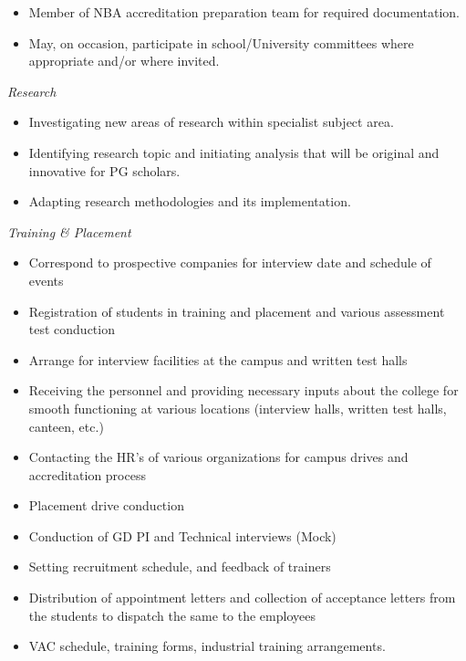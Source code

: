 \begin{experiences}
{\begin{itemize}
                  			\item Member of NBA accreditation preparation team for required documentation.     
                  			         
                  			\item May, on occasion, participate in school/University committees where appropriate and/or where invited.  
                  	    \end{itemize}
                     
                      \textit{Research}
                      \begin{itemize}
                      
                      	\item Investigating new areas of research within specialist subject area. 
                      	\item Identifying research topic and initiating analysis that will be original and innovative for PG scholars.
                     	\item Adapting research methodologies and its implementation.
                      	  
                      \end{itemize}
                         \vspace{0.5em}
	                  \textit{Training \& Placement}
                  	\begin{itemize}
                  	
                  	\item Correspond to prospective companies for interview date and schedule of events
                  	\item Registration of students in training and placement and various assessment test conduction
                  	\item Arrange for interview facilities at the campus and written test halls
                  	\item Receiving the personnel and providing necessary inputs about the college for smooth functioning at various locations (interview halls, written test halls, canteen, etc.)
                  	\item Contacting the HR’s of various organizations for campus drives and accreditation process
                  	\item Placement drive conduction
                  	\item Conduction of GD PI and Technical interviews (Mock)
                  	\item Setting recruitment schedule, and feedback of trainers
                  	\item Distribution of appointment letters and collection of acceptance letters from the students to dispatch the same to the employees
                  	\item VAC schedule, training forms, industrial training arrangements.
                  	

\end{itemize}}
\end{experiences}
